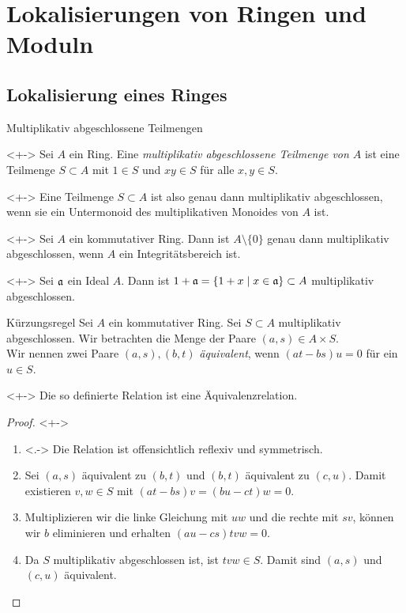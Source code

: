 \section{Lokalisierungen von Ringen und Moduln}

\subsection{Lokalisierung eines Ringes}

\begin{frame}{Multiplikativ abgeschlossene Teilmengen}
	\begin{definition}<+->
		Sei \(A\) ein Ring. Eine \emph{multiplikativ abgeschlossene Teilmenge von \(A\)} ist eine Teilmenge \(S \subset A\)
		mit \(1 \in S\) und \(x y \in S\) für alle \(x, y \in S\).
	\end{definition}
	\begin{visibleenv}<+->
		Eine Teilmenge \(S \subset A\) ist also genau dann multiplikativ abgeschlossen, wenn sie ein Untermonoid des
		multiplikativen Monoides von \(A\) ist.
	\end{visibleenv}
	\begin{example}<+->
		Sei \(A\) ein kommutativer Ring. Dann ist \(A \setminus \{0\}\) genau dann multiplikativ abgeschlossen,
		wenn \(A\) ein Integritätsbereich ist.
	\end{example}
	\begin{example}<+->
		Sei \(\mathfrak{a}\) ein Ideal \(A\). Dann ist \(1 + \mathfrak{a} = \{1 + x \mid x \in \mathfrak{a}\} \subset A\) multiplikativ
		abgeschlossen.
	\end{example}
\end{frame}

\begin{frame}{Kürzungsregel}
	Sei \(A\) ein kommutativer Ring. Sei \(S \subset A\) multiplikativ abgeschlossen. Wir betrachten die
	Menge der Paare \((a, s) \in A \times S\).
	\\
	Wir nennen zwei Paare \((a, s), (b, t)\) \emph{äquivalent}, wenn \((at - bs) u = 0\) für ein \(u \in S\).
	\begin{proposition}<+->
		Die so definierte Relation ist eine Äquivalenzrelation.
	\end{proposition}
	\begin{proof}<+->
		\begin{enumerate}[<+->]
		\item<.->
			Die Relation ist offensichtlich reflexiv und symmetrisch.
		\item
			Sei \((a, s)\) äquivalent zu \((b, t)\) und \((b, t)\) äquivalent zu \((c, u)\). Damit
			existieren \(v, w \in S\) mit \((a t - b s) v = (b u - c t) w = 0\).
		\item
			Multiplizieren wir die linke Gleichung mit \(uw\) und die rechte mit \(sv\), können wir \(b\)
			eliminieren und erhalten \((au - cs) tvw = 0\).
		\item
			Da \(S\) multiplikativ abgeschlossen ist, ist \(tvw \in S\). Damit sind \((a, s)\) und \((c, u)\)
			äquivalent.
			\qedhere
		\end{enumerate}
	\end{proof}
\end{frame}

